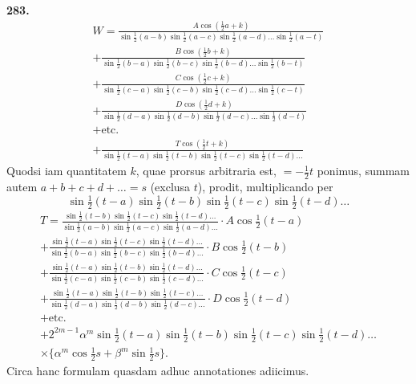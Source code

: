 \documentclass[12pt,a4paper]{article}
\begin{document}
\newpage
\noindent\textbf{283.}
\begin{multline*}
W =
\frac{A\cos(\tfrac{1}{2}a+k)}{\sin\tfrac{1}{2}(a-b)\sin\tfrac{1}{2}(a-c)\sin\tfrac{1}{2}(a-d)\dots\sin\tfrac{1}{2}(a-t)}\\
+ \frac{B\cos(\tfrac{1}{2}b+k)}{\sin\tfrac{1}{2}(b-a)\sin\tfrac{1}{2}(b-c)\sin\tfrac{1}{2}(b-d)\dots\sin\tfrac{1}{2}(b-t)}\\
+ \frac{C\cos(\tfrac{1}{2}c+k)}{\sin\tfrac{1}{2}(c-a)\sin\tfrac{1}{2}(c-b)\sin\tfrac{1}{2}(c-d)\dots\sin\tfrac{1}{2}(c-t)}\\
+ \frac{D\cos(\tfrac{1}{2}d+k)}{\sin\tfrac{1}{2}(d-a)\sin\tfrac{1}{2}(d-b)\sin\tfrac{1}{2}(d-c)\dots\sin\tfrac{1}{2}(d-t)}\\
+ \text{etc.}\\
+ \frac{T\cos(\tfrac{1}{2}t+k)}{\sin\tfrac{1}{2}(t-a)\sin\tfrac{1}{2}(t-b)\sin\tfrac{1}{2}(t-c)\sin\tfrac{1}{2}(t-d)\dots}
\end{multline*}
Quodsi iam quantitatem $k$, quae prorsus arbitraria est, $=-\frac{1}{2}t$ ponimus,
summam autem $a+b+c+d+\dots = s$ (exclusa $t$), prodit, multiplicando per
\begin{equation*}
\sin\tfrac{1}{2}(t-a)\sin\tfrac{1}{2}(t-b)\sin\tfrac{1}{2}(t-c)\sin\tfrac{1}{2}(t-d)\dots
\end{equation*}
\begin{multline*}
T =
\frac{\sin\tfrac{1}{2}(t-b)\sin\tfrac{1}{2}(t-c)\sin\tfrac{1}{2}(t-d)\dots}
     {\sin\tfrac{1}{2}(a-b)\sin\tfrac{1}{2}(a-c)\sin\tfrac{1}{2}(a-d)\dots}
\cdot A\cos\tfrac{1}{2}(t-a)\\
+ \frac{\sin\tfrac{1}{2}(t-a)\sin\tfrac{1}{2}(t-c)\sin\tfrac{1}{2}(t-d)\dots}
       {\sin\tfrac{1}{2}(b-a)\sin\tfrac{1}{2}(b-c)\sin\tfrac{1}{2}(b-d)\dots}
\cdot B\cos\tfrac{1}{2}(t-b)\\
+ \frac{\sin\tfrac{1}{2}(t-a)\sin\tfrac{1}{2}(t-b)\sin\tfrac{1}{2}(t-d)\dots}
       {\sin\tfrac{1}{2}(c-a)\sin\tfrac{1}{2}(c-b)\sin\tfrac{1}{2}(c-d)\dots}
\cdot C\cos\tfrac{1}{2}(t-c)\\
+ \frac{\sin\tfrac{1}{2}(t-a)\sin\tfrac{1}{2}(t-b)\sin\tfrac{1}{2}(t-c)\dots}
       {\sin\tfrac{1}{2}(d-a)\sin\tfrac{1}{2}(d-b)\sin\tfrac{1}{2}(d-c)\dots}
\cdot D\cos\tfrac{1}{2}(t-d)\\
+ \text{etc.}\\
+ 2^{2m-1}\alpha^m\sin\tfrac{1}{2}(t-a)\sin\tfrac{1}{2}(t-b)\sin\tfrac{1}{2}(t-c)\sin\tfrac{1}{2}(t-d)\dots\\
\times\{\alpha^m\cos\tfrac{1}{2}s + \beta^m\sin\tfrac{1}{2}s\}.
\end{multline*}
Circa hanc formulam quasdam adhuc annotationes adiicimus.
\end{document}
